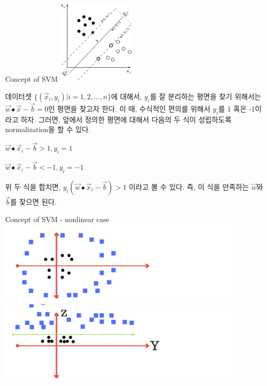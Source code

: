 \documentclass{beamer}
\begin{document}
\begin{frame}[allowframebreaks]{Concept of SVM}
\includegraphics[height=4cm,keepaspectratio]{svmconcpet}


데이터셋 $\{(\vec{x}_i, y_i)| i = 1,2,...,n\}$에 대해서, $y_i$를 잘 분리하는 평면을 찾기 위해서는 $\vec{w} \bullet \vec{x} - \vec{b} = 0$인 평면을 찾고자 한다. 이 때, 수식적인 편의를 위해서 $y_i$를 1 혹은 -1이라고 하자. 그러면, 앞에서 정의한 평면에 대해서 다음의 두 식이 성립하도록 normalization을 할 수 있다. 


$\vec{w} \bullet \vec{x}_i - \vec{b} > 1 , y_i = 1 $

$\vec{w} \bullet \vec{x}_i - \vec{b} < -1 , y_i = -1$


위 두 식을 합치면, $y_i(\vec{w} \bullet \vec{x}_i - \vec{b} )>1$ 이라고 볼 수 있다. 즉, 이 식을 만족하는 $\vec{w}$와 $\vec{b}$를 찾으면 된다. 

\end{frame}

\begin{frame}{Concept of SVM - nonlinear case }
\includegraphics[height=4cm,keepaspectratio]{nonlinear}
\includegraphics[height=4cm,keepaspectratio]{linear}
\end{frame}
\end{document}
